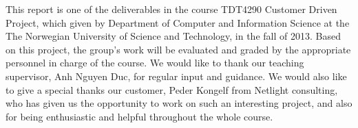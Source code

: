 This report is one of the deliverables in the course TDT4290 Customer Driven Project, which given by Department of Computer and Information Science at the The Norwegian University of Science and Technology, in the fall of 2013. Based on this project, the group's work will be evaluated and graded by the appropriate personnel in charge of the course. 
We would like to thank our teaching supervisor, Anh Nguyen Duc, for regular input and guidance. 
We would also like to give a special thanks our customer, Peder  Kongelf from  Netlight consulting, who has given us the opportunity to work on such an interesting project, and also for being enthusiastic and helpful throughout the whole course.